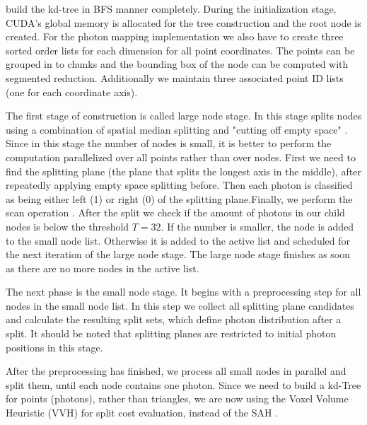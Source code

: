 \citeauthor{Zhou2008} build the kd-tree in BFS manner completely. During the initialization stage, CUDA's global memory is allocated for the tree construction and the root node is created. For the photon mapping implementation we also have to create three sorted order lists for each dimension for all point coordinates. The points can be grouped in to chunks and the bounding box of the node can be computed with segmented reduction. Additionally we maintain three associated point ID lists (one for each coordinate axis). 

The first stage of construction is called large node stage. In this stage splits nodes using a combination of spatial median splitting and "cutting off empty space" \cite{Havran2000:PhD}. Since in this stage the number of nodes is small, it is better to perform the computation parallelized over all points rather than over nodes. First we need to find the splitting plane (the plane that splits the longest axis in the middle), after repeatedly applying empty space splitting before. Then each photon is classified as being either left (1) or right (0) of the splitting plane.Finally, we perform the scan operation \cite{Mark2007}. After the split we check if the amount of photons in our child nodes is below the threshold \(T = 32\). If the number is smaller, the node is added to the small node list. Otherwise it is added to the active list and scheduled for the next iteration of the large node stage. The large node stage finishes as soon as there are no more nodes in the active list.

The next phase is the small node stage. It begins with a preprocessing step for all nodes in the small node list. In this step we collect all splitting plane candidates and calculate the resulting split sets, which define photon distribution after a split. It should be noted that splitting planes are restricted to initial photon positions in this stage.

After the preprocessing has finished, we process all small nodes in parallel and split them, until each node contains one photon. Since we need to build a kd-Tree for points (photons), rather than triangles, we are now using the Voxel Volume Heuristic (VVH) \cite{wald:04:VVH} for split cost evaluation, instead of the SAH \cite{Havran2000:PhD}. 

